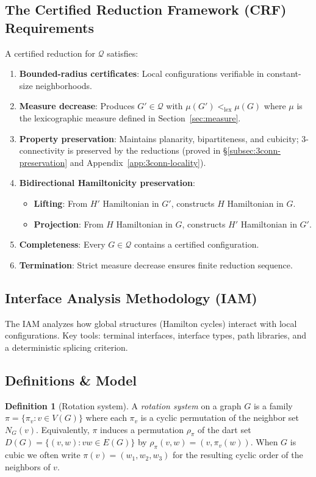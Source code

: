 \documentclass[12pt]{article}
\theoremstyle{definition}
\newtheorem{definition}[theorem]{Definition}
\begin{document}
\subsection{The Certified Reduction Framework (CRF) Requirements}
A certified reduction for $\mathcal{Q}$ satisfies:
\begin{enumerate}
    \item[(CRF1)] \textbf{Bounded-radius certificates}: Local configurations verifiable in constant-size neighborhoods.
    \item[(CRF2)] \textbf{Measure decrease}: Produces $G' \in \mathcal{Q}$ with $\mu(G') <_{\text{lex}} \mu(G)$ where $\mu$ is the lexicographic measure defined in Section~\ref{sec:measure}.
    \item[(CRF3)] \textbf{Property preservation}: Maintains planarity, bipartiteness, and cubicity; 3-connectivity is preserved by the reductions (proved in \S\ref{subsec:3conn-preservation} and Appendix~\ref{app:3conn-locality}).
    \item[(CRF4)] \textbf{Bidirectional Hamiltonicity preservation}:
    \begin{itemize}
        \item \textbf{Lifting}: From $H'$ Hamiltonian in $G'$, constructs $H$ Hamiltonian in $G$.
        \item \textbf{Projection}: From $H$ Hamiltonian in $G$, constructs $H'$ Hamiltonian in $G'$.
    \end{itemize}
    \item[(CRF5)] \textbf{Completeness}: Every $G \in \mathcal{Q}$ contains a certified configuration.
    \item[(CRF6)] \textbf{Termination}: Strict measure decrease ensures finite reduction sequence.
\end{enumerate}

\subsection{Interface Analysis Methodology (IAM)}
The IAM analyzes how global structures (Hamilton cycles) interact with local configurations. Key tools: terminal interfaces, interface types, path libraries, and a deterministic splicing criterion.

\subsection{Definitions \& Model}
\label{subsec:definitions-model}

\begin{definition}[Rotation system]\label{def:rotation-system}
A \emph{rotation system} on a graph $G$ is a family $\pi=\{\pi_v : v\in V(G)\}$ where each $\pi_v$ is a cyclic permutation of the neighbor set $N_G(v)$.
Equivalently, $\pi$ induces a permutation $\rho_\pi$ of the dart set $D(G)=\{(v,w):vw\in E(G)\}$ by $\rho_\pi(v,w)=(v,\pi_v(w))$.
When $G$ is cubic we often write $\pi(v)=(w_1,w_2,w_3)$ for the resulting cyclic order of the neighbors of $v$.
\end{definition}
\end{document}
